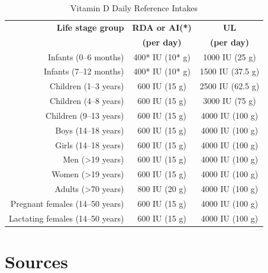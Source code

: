 \documentclass{book}
\begin{document}
\begin{sloppypar}
\begin{table}[ht]
	\caption{Vitamin D Daily Reference Intakes}
	\centering \begin{tabular}{| r | c | c |}
		\hline
		\textbf{Life stage group}			& \textbf{RDA or AI(*)}		& \textbf{UL}				\\
											& \textbf{(per day)}		& \textbf{(per day)}		\\ \hline
		Infants (0--6 months)				& 400* IU (10* \textmu g)	& 1000 IU (25 \textmu g)	\\ \hline
		Infants (7--12 months)				& 400* IU (10* \textmu g)	& 1500 IU (37.5 \textmu g)	\\ \hline
		Children (1--3 years)				& 600 IU (15 \textmu g)		& 2500 IU (62.5 \textmu g)	\\ \hline
		Children (4--8 years)				& 600 IU (15 \textmu g)		& 3000 IU (75 \textmu g)	\\ \hline
		Children (9--13 years)				& 600 IU (15 \textmu g)		& 4000 IU (100 \textmu g)	\\ \hline
		Boys (14--18 years)					& 600 IU (15 \textmu g)		& 4000 IU (100 \textmu g)	\\ \hline
		Girls (14--18 years)				& 600 IU (15 \textmu g)		& 4000 IU (100 \textmu g)	\\ \hline
		Men (\textgreater19 years)			& 600 IU (15 \textmu g)		& 4000 IU (100 \textmu g)	\\ \hline
		Women (\textgreater19 years)		& 600 IU (15 \textmu g)		& 4000 IU (100 \textmu g)	\\ \hline
		Adults (\textgreater70 years)		& 800 IU (20 \textmu g)		& 4000 IU (100 \textmu g)	\\ \hline
		Pregnant females (14--50 years)		& 600 IU (15 \textmu g)		& 4000 IU (100 \textmu g)	\\ \hline
		Lactating females (14--50 years)	& 600 IU (15 \textmu g)		& 4000 IU (100 \textmu g)	\\ \hline
	\end{tabular}
\end{table}
\newpage

\section{Sources}



\end{sloppypar}
\end{document}
